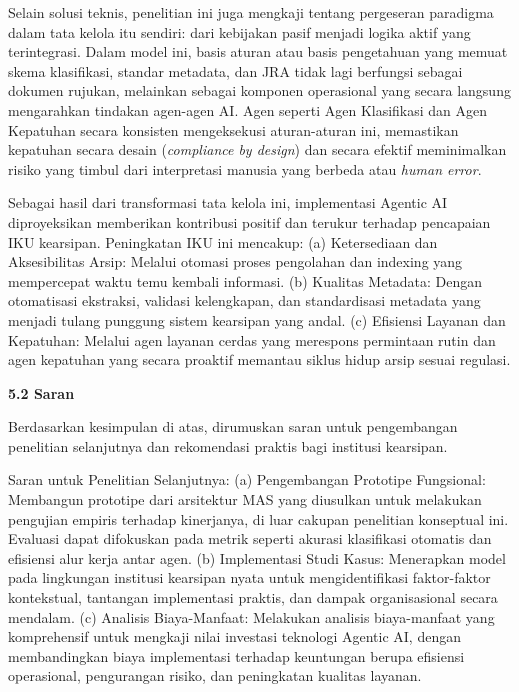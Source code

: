 Selain solusi teknis, penelitian ini juga mengkaji tentang pergeseran
paradigma dalam tata kelola itu sendiri: dari kebijakan pasif menjadi
logika aktif yang terintegrasi. Dalam model ini, basis aturan atau basis
pengetahuan yang memuat skema klasifikasi, standar metadata, dan JRA
tidak lagi berfungsi sebagai dokumen rujukan, melainkan sebagai komponen
operasional yang secara langsung mengarahkan tindakan agen-agen AI. Agen
seperti Agen Klasifikasi dan Agen Kepatuhan secara konsisten
mengeksekusi aturan-aturan ini, memastikan kepatuhan secara desain
(\emph{compliance by design}) dan secara efektif meminimalkan risiko
yang timbul dari interpretasi manusia yang berbeda atau \emph{human
error}.

Sebagai hasil dari transformasi tata kelola ini, implementasi Agentic AI
diproyeksikan memberikan kontribusi positif dan terukur terhadap
pencapaian IKU kearsipan. Peningkatan IKU ini mencakup: (a) Ketersediaan
dan Aksesibilitas Arsip: Melalui otomasi proses pengolahan dan indexing
yang mempercepat waktu temu kembali informasi. (b) Kualitas Metadata:
Dengan otomatisasi ekstraksi, validasi kelengkapan, dan standardisasi
metadata yang menjadi tulang punggung sistem kearsipan yang andal. (c)
Efisiensi Layanan dan Kepatuhan: Melalui agen layanan cerdas yang
merespons permintaan rutin dan agen kepatuhan yang secara proaktif
memantau siklus hidup arsip sesuai regulasi.

\textbf{5.2 Saran}

Berdasarkan kesimpulan di atas, dirumuskan saran untuk pengembangan
penelitian selanjutnya dan rekomendasi praktis bagi institusi kearsipan.

Saran untuk Penelitian Selanjutnya: (a) Pengembangan Prototipe
Fungsional: Membangun prototipe dari arsitektur MAS yang diusulkan untuk
melakukan pengujian empiris terhadap kinerjanya, di luar cakupan
penelitian konseptual ini. Evaluasi dapat difokuskan pada metrik seperti
akurasi klasifikasi otomatis dan efisiensi alur kerja antar agen. (b)
Implementasi Studi Kasus: Menerapkan model pada lingkungan institusi
kearsipan nyata untuk mengidentifikasi faktor-faktor kontekstual,
tantangan implementasi praktis, dan dampak organisasional secara
mendalam. (c) Analisis Biaya-Manfaat: Melakukan analisis biaya-manfaat
yang komprehensif untuk mengkaji nilai investasi teknologi Agentic AI,
dengan membandingkan biaya implementasi terhadap keuntungan berupa
efisiensi operasional, pengurangan risiko, dan peningkatan kualitas
layanan.

